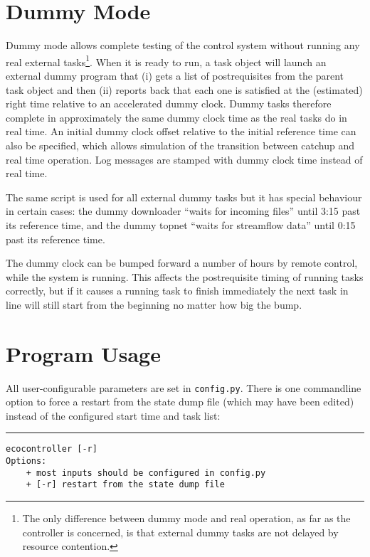 \documentclass[11pt,a4paper]{report}
\begin{document}
\chapter{Dummy Mode}

Dummy mode allows complete testing of the control system without running
any real external tasks\footnote{The only difference between dummy mode
and real operation, as far as the controller is concerned, is that
external dummy tasks are not delayed by resource contention.}. When it
is ready to run, a task object will launch an external dummy program
that (i) gets a list of postrequisites from the parent task object and
then (ii) reports back that each one is satisfied at the (estimated)
right time relative to an accelerated dummy clock. Dummy tasks therefore
complete in approximately the same dummy clock time as the real tasks do
in real time. An initial dummy clock offset relative to the initial
reference time can also be specified, which allows simulation of the
transition between catchup and real time operation. Log messages are
stamped with dummy clock time instead of real time.

The same script is used for all external dummy tasks but it has special
behaviour in certain cases: the dummy downloader ``waits for incoming
files'' until 3:15 past its reference time, and the dummy topnet ``waits
for streamflow data'' until 0:15 past its reference time.

The dummy clock can be bumped forward a number of hours by remote
control, while the system is running. This affects the postrequisite
timing of running tasks correctly, but if it causes a running task to
finish immediately the next task in line will still start from the
beginning no matter how big the bump.


\chapter{Program Usage}

All user-configurable parameters are set in \verb#config.py#. There is
one commandline option to force a restart from the state dump file
(which may have been edited) instead of the configured start time and
task list:

\lstset{language=sh}

\noindent
\rule{5cm}{.2mm}
\begin{lstlisting}
ecocontroller [-r]
Options:
    + most inputs should be configured in config.py
    + [-r] restart from the state dump file
\end{lstlisting}
\end{document}
